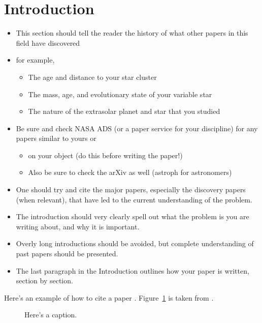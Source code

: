 \documentclass[twocolumn]{aastex61}
\begin{document}
\section{Introduction}
\begin{itemize}\itemsep0em
\item This section should tell the reader the history of what other papers in this field have discovered
\item for example,
\begin{itemize}\itemsep0em
\item The age and distance to your star cluster
\item The mass, age, and evolutionary state of your variable star
\item The nature of the extrasolar planet and star that you studied
\end{itemize}
\item Be sure and check NASA ADS (or a paper service for your discipline) for any papers similar to yours or 
\begin{itemize}\itemsep0em
\item on your object (do this before writing the paper!)
\item Also be sure to check the arXiv as well (astroph for astronomers)
\end{itemize}
\item One should try and cite the major papers, especially the discovery papers (when relevant), that have led to the current understanding of the problem.
\item The introduction should very clearly spell out what the problem is you are writing about, and why it is important.
\item Overly long introductions should be avoided, but complete understanding of past papers should be presented.
\item The last paragraph in the Introduction outlines how your paper is written, section by section.
\end{itemize}

Here's an example of how to cite a paper \citep{1931ApJ....74...43H}.  Figure~\ref{f:CMDreg} is taken from \citet{2017ApJ...842....1G}.

\begin{figure}[!t]
\caption{
Here's a caption.
\label{f:CMDreg}
}
\end{figure}
\end{document}

